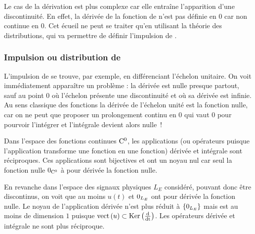 	Le cas de la dérivation est plus complexe car elle entraîne
        l'apparition d'une discontinuité. En effet, la dérivée de la
        fonction de \Heaviside{} n'est pas définie en $0$ car non
        continue en $0$. Cet écueil ne peut se traiter qu'en utilisant
        la théorie des distributions, qui va permettre de définir
        l'impulsion de \Dirac.
	
	\subsubsection{Impulsion ou distribution de \Dirac}
	
	L'impulsion de \Dirac{} se trouve, par exemple, en
        différenciant l'échelon unitaire. On voit immédiatement
        apparaître un problème : la dérivée est nulle presque partout,
        sauf au point 0 où l'échelon présente une discontinuité et où
        sa dérivée est infinie. Au sens classique des fonctions la
        dérivée de l'échelon unité est la fonction nulle, car on ne
        peut que proposer un prolongement continu en $0$ qui vaut $0$
        pour pourvoir l'intégrer et l'intégrale devient alors nulle~!

        \begin{remarque}
          Dans l'espace des fonctions continues $\mathrm{C}^0$, les
          applications (ou opérateurs puisque l'application transforme
          une fonction en une fonction) dérivée et intégrale
          sont réciproques. Ces applications sont bijectives et ont un
          noyau nul car seul la fonction nulle $\mathrm{0}_{\mathrm{C}^0}$
          à pour dérivée la fonction nulle.

          En revanche dans l'espace des signaux physiques $L_E$
          considéré, pouvant donc être discontinus, on voit que au
          moins $u(t)$ et $\mathrm{0}_{L_E}$ ont pour dérivée la fonction
          nulle. Le noyau de l'application dérivée n'est plus réduit à
          $\{\mathrm{0}_{L_E}\}$ mais est au moins de dimension $1$
          puisque $\mathrm{vect}\left(u\right) \subset \mathrm{Ker}\left(\frac{\mathrm{d{}}}{\mathrm{d{t}}}\right)$. Les opérateurs
          dérivée et intégrale ne sont plus réciproque.
        \end{remarque}
        
